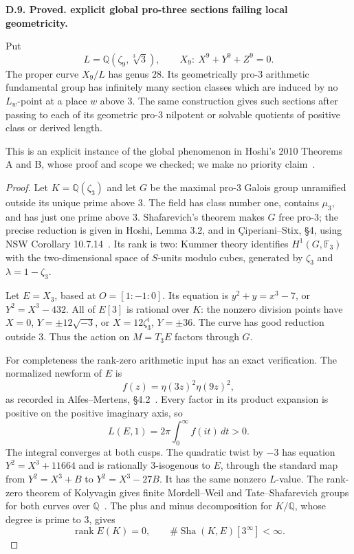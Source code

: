 \documentclass[11pt,oneside]{article}
\makeatletter
\newcommand{\Sha}{\operatorname{Sha}}
\newcounter{statementanchor}
\newenvironment{statement}[3]{%
 \refstepcounter{statementanchor}\def\@currentlabel{#1}%
 \par\addvspace{9pt}\noindent
 \textbf{#1. #2. #3.}\par\nobreak\noindent\ignorespaces
}{\par\addvspace{5pt}}
\makeatother
\begin{document}
\begin{statement}{D.9}{Proved}{explicit global pro-three sections failing local geometricity}
\label{st:D.9}
\label{D-global-prothree}
Put
\[
 L=\mathbb Q(\zeta_9,\sqrt[3]{3}),\qquad
 X_9:\ X^9+Y^9+Z^9=0 .
\]
The proper curve $X_9/L$ has genus $28$. Its
geometrically pro-$3$ arithmetic fundamental
group has infinitely many section classes
which are induced by no $L_w$-point at a
place $w$ above $3$. The same construction
gives such sections after passing to each
of its geometric pro-$3$ nilpotent or
solvable quotients of positive class or
derived length.

This is an explicit instance of the global
phenomenon in Hoshi's 2010 Theorems A and B,
whose proof and scope we checked; we make
no priority claim~\cite{Hoshi2010}.
\end{statement}
\begin{proof}
Let $K=\mathbb Q(\zeta_3)$ and let $G$ be
the maximal pro-$3$ Galois group unramified
outside its unique prime above $3$.
The field has class number one, contains
$\mu_3$, and has just one prime above $3$.
Shafarevich's theorem makes $G$ free pro-$3$;
the precise reduction is given in
Hoshi, Lemma 3.2, and in
\c{C}iperiani--Stix, \S4, using
NSW Corollary 10.7.14~\cite{CiperianiStix}.
Its rank is two: Kummer theory identifies
$H^1(G,\mathbb F_3)$ with the two-dimensional
space of $S$-units modulo cubes, generated
by $\zeta_3$ and $\lambda=1-\zeta_3$.

Let $E=X_3$, based at $O=[1:-1:0]$.
Its equation is $y^2+y=x^3-7$, or
$Y^2=X^3-432$. All of $E[3]$ is rational
over $K$: the nonzero division points have
$X=0$, $Y=\pm12\sqrt{-3}$, or
$X=12\zeta_3^i$, $Y=\pm36$.
The curve has good reduction outside $3$.
Thus the action on $M=T_3E$ factors through $G$.

For completeness the rank-zero arithmetic input
has an exact verification. The normalized
newform of $E$ is
\[
 f(z)=\eta(3z)^2\eta(9z)^2 ,
\]
as recorded in Alfes--Mertens, \S4.2~\cite{AlfesMertens2024}.
Every factor in its product expansion is
positive on the positive imaginary axis, so
\[
 L(E,1)=2\pi\int_0^\infty f(it)\,dt>0.
\]
The integral converges at both cusps. The
quadratic twist by $-3$ has equation
$Y^2=X^3+11664$ and is rationally
$3$-isogenous to $E$, through the standard
map from $Y^2=X^3+B$ to
$Y^2=X^3-27B$. It has the same nonzero
$L$-value. The rank-zero theorem of
Kolyvagin gives finite Mordell--Weil and
Tate--Shafarevich groups for both curves
over $\mathbb Q$~\cite{Kolyvagin1988}.
The plus and minus decomposition for
$K/\mathbb Q$, whose degree is prime to
$3$, gives
\[
 \operatorname{rank}E(K)=0,\qquad
 \#\Sha(K,E)[3^\infty]<\infty .
\]


\end{proof}
\end{document}
